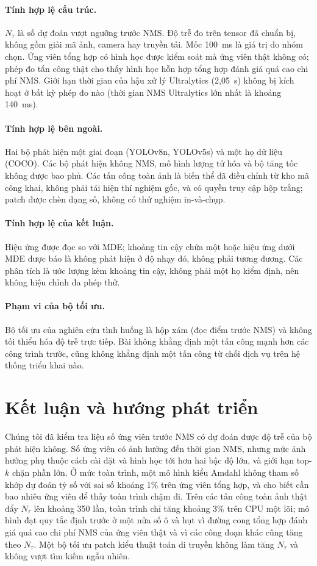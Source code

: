 \documentclass[a4paper,fleqn]{cas-dc}
\newcommand{\Ntau}{N_{\tau}}
\begin{document}
\paragraph{Tính hợp lệ cấu trúc.}
$\Ntau$ là số dự đoán vượt ngưỡng trước NMS. Độ trễ đo trên tensor đã chuẩn bị, không gồm giải mã ảnh, camera hay truyền tải. Mốc 100~ms là giá trị do nhóm chọn. Ứng viên tổng hợp có hình học được kiểm soát mà ứng viên thật không có; phép đo tấn công thật cho thấy hình học hỗn hợp tổng hợp đánh giá quá cao chi phí NMS. Giới hạn thời gian của hậu xử lý Ultralytics (2,05~s) không bị kích hoạt ở bất kỳ phép đo nào (thời gian NMS Ultralytics lớn nhất là khoảng 140~ms).
\paragraph{Tính hợp lệ bên ngoài.}
Hai bộ phát hiện một giai đoạn (YOLOv8n, YOLOv5s) và một họ dữ liệu (COCO). Các bộ phát hiện không NMS, mô hình lượng tử hóa và bộ tăng tốc không được bao phủ. Các tấn công toàn ảnh là biến thể đã điều chỉnh từ kho mã công khai, không phải tái hiện thí nghiệm gốc, và có quyền truy cập hộp trắng; patch được chèn dạng số, không có thử nghiệm in-và-chụp.
\paragraph{Tính hợp lệ của kết luận.}
Hiệu ứng được đọc so với MDE; khoảng tin cậy chứa một hoặc hiệu ứng dưới MDE được báo là không phát hiện ở độ nhạy đó, không phải tương đương. Các phân tích là ước lượng kèm khoảng tin cậy, không phải một họ kiểm định, nên không hiệu chỉnh đa phép thử.
\paragraph{Phạm vi của bộ tối ưu.}
Bộ tối ưu của nghiên cứu tình huống là hộp xám (đọc điểm trước NMS) và không tối thiểu hóa độ trễ trực tiếp. Bài không khẳng định một tấn công mạnh hơn các công trình trước, cũng không khẳng định một tấn công từ chối dịch vụ trên hệ thống triển khai nào.

\section{Kết luận và hướng phát triển}
\label{sec:conclusion}
Chúng tôi đã kiểm tra liệu số ứng viên trước NMS có dự đoán được độ trễ của bộ phát hiện không. Số ứng viên có ảnh hưởng đến thời gian NMS, nhưng mức ảnh hưởng phụ thuộc cách cài đặt và hình học tới hơn hai bậc độ lớn, và giới hạn top-$k$ chặn phần lớn. Ở mức toàn trình, một mô hình kiểu Amdahl không tham số khớp dự đoán tỷ số với sai số khoảng 1\% trên ứng viên tổng hợp, và cho biết cần bao nhiêu ứng viên để thấy toàn trình chậm đi. Trên các tấn công toàn ảnh thật đẩy $\Ntau$ lên khoảng 350 lần, toàn trình chỉ tăng khoảng 3\% trên CPU một lõi; mô hình đạt quy tắc định trước ở một nửa số ô và hụt vì đường cong tổng hợp đánh giá quá cao chi phí NMS của ứng viên thật và vì các công đoạn khác cũng tăng theo $\Ntau$. Một bộ tối ưu patch kiểu thuật toán di truyền không làm tăng $\Ntau$ và không vượt tìm kiếm ngẫu nhiên.
\end{document}
